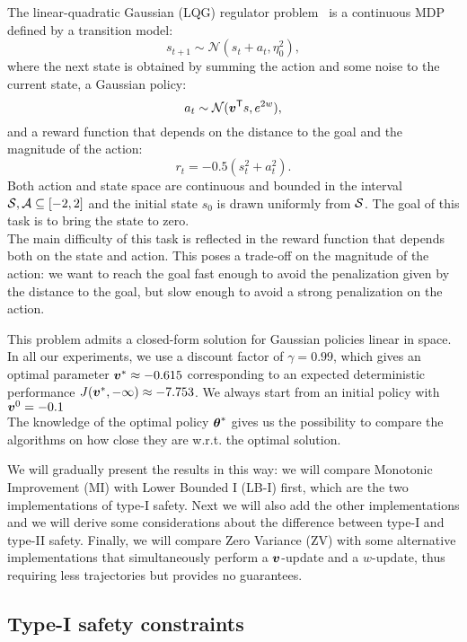 The linear-quadratic Gaussian (LQG) regulator problem~\cite{peters} is a continuous MDP defined by a transition model:
\[
s_{t+1}\sim \mathcal{N}(s_t + a_t, \eta_0^2),
\]
where the next state is obtained by summing the action and some noise to the current state, a Gaussian policy:
\[
a_t \sim \mathcal{N}({\boldsymbol{v}}^{\mathsf{T}}s, e^{2w}),
\]
and a reward function that depends on the distance to the goal and the magnitude of the action:
\[
r_t = -0.5(s_t^2 + a_t^2).
\]
Both action and state space are continuous and bounded in the interval $\mathcal{S}, \mathcal{A} \subseteq [-2, 2]$ and the initial state $s_0$ is drawn uniformly from $\mathcal{S}$. The goal of this task is to bring the state to zero. \\
The main difficulty of this task is reflected in the reward function that depends both on the state and action. This poses a trade-off on the magnitude of the action: we want to reach the goal fast enough to avoid the penalization given by the distance to the goal, but slow enough to avoid a strong penalization on the action. 

This problem admits a closed-form solution for Gaussian policies linear in space. In all our experiments, we use a discount factor of $\gamma=0.99$, which gives an optimal parameter $\boldsymbol{v}^* \approx -0.615$ corresponding to an expected deterministic performance $J(\boldsymbol{v}^*, -\infty)\approx-7.753$. We always start from an initial policy with $\boldsymbol{v}^0=-0.1$ \\
The knowledge of the optimal policy ${\boldsymbol{\theta}}^*$ gives us the possibility to compare the algorithms on how close they are w.r.t. the optimal solution.

We will gradually present the results in this way: we will compare Monotonic Improvement (MI) with Lower Bounded I (LB-I) first, which are the two implementations of type-I safety. Next we will also add the other implementations and we will derive some considerations about the difference between type-I and type-II safety. Finally, we will compare Zero Variance (ZV) with some alternative implementations that simultaneously perform a $\boldsymbol{v}$-update and a $w$-update, thus requiring less trajectories but provides no guarantees.

\subsection{Type-I safety constraints}

